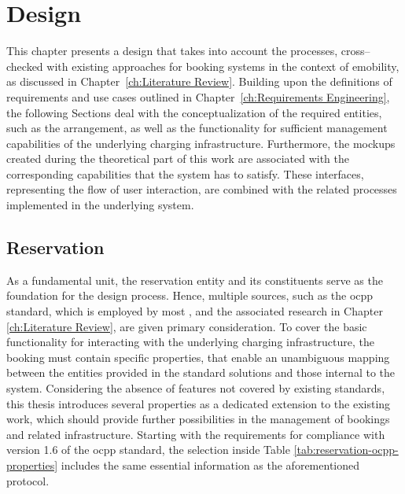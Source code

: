 
\chapter{Design}
\label{ch:Design}

This chapter presents a design that takes into account the processes, cross--checked with existing approaches for booking systems in the context of \acrshort{emobility}, as discussed in Chapter~\ref{ch:Literature Review}. 
Building upon the definitions of requirements and use cases outlined in Chapter~\ref{ch:Requirements Engineering}, the following Sections deal with the conceptualization of the required entities, such as the arrangement, as well as the functionality for sufficient management capabilities of the underlying charging infrastructure.
Furthermore, the mockups created during the theoretical part of this work are associated with the corresponding capabilities that the system has to satisfy. These interfaces, representing the flow of user interaction, are combined with the related processes implemented in the underlying system.

\section{Reservation}
\label{ch:Design:sec:Reservation}

As a fundamental unit, the reservation entity and its constituents serve as the foundation for the design process.  
Hence, multiple sources, such as the \acrshort{ocpp} standard, which is employed by most , and the associated research in Chapter \ref{ch:Literature Review}, are given primary consideration.
To cover the basic functionality for interacting with the underlying charging infrastructure, the booking must contain specific properties, that enable an unambiguous mapping between the entities provided in the standard solutions and those internal to the system.
Considering the absence of features not covered by existing standards, this thesis introduces several properties as a dedicated extension to the existing work, which should provide further possibilities in the management of bookings and related infrastructure.
Starting with the requirements for compliance with version 1.6 of the \acrshort{ocpp} standard, the selection inside Table \ref{tab:reservation-ocpp-properties} includes the same essential information as the aforementioned protocol.

